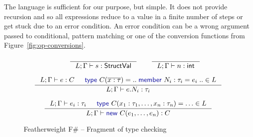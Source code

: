 \documentclass[preprint]{sigplanconf}
\newcommand{\kvd}[1]{\textnormal{\textcolor{kvdclr}{\sffamily #1}}}
\newcommand{\ident}[1]{\textnormal{\sffamily #1}}
\begin{document}
The language is sufficient for our purpose, but simple. It does not provide recursion
and so all expressions reduce to a value in a finite number of steps or get stuck due to an error
condition. An error condition can be a wrong argument passed to conditional, pattern matching or
one of the conversion functions from Figure~\ref{fig:op-conversions}.


\begin{figure}
\begin{equation*}
\qquad
\inference
  {~}
  {L; \Gamma \vdash s : \ident{StructVal}}
\qquad  
\inference
  {~}
  {L; \Gamma \vdash n : \ident{int}}
\end{equation*}

\begin{equation*}
\inference
  {L; \Gamma \vdash e : C & \kvd{type}~C(\overline{x:\tau}) = ..\;\kvd{member}~N_i : \tau_i = e_i\;.. \in L}
  {L; \Gamma \vdash e.N_i:\tau_i}
\end{equation*}

\begin{equation*}
\inference
  {L; \Gamma \vdash e_i : \tau_i & \kvd{type}~C(x_1:\tau_1, \ldots, x_n:\tau_n) = \ldots \in L}
  {L; \Gamma \vdash \kvd{new}~C(e_1, \ldots, e_n):C}
\end{equation*}

\caption{Featherweight F\# -- Fragment of type checking}
\label{fig:ff-typecheck}
\end{figure}

\end{document}
